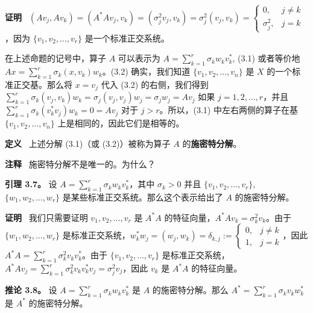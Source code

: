 \textbf{证明}~ $(Av_j, Av_k) = (A^*Av_j, v_k) = (\sigma_j^2 v_j, v_k) = \sigma_j^2 (v_j, v_k) = \begin{cases} 0, & j \neq k \\ \sigma_j^2, & j = k \end{cases}$，因为 $\{v_1, v_2, \dots, v_r\}$ 是一个标准正交系统。

在上述命题的记号中，算子 $A$ 可以表示为
$A = \sum_{k=1}^r \sigma_k w_k v_k^*$, (3.1)
或者等价地
$Ax = \sum_{k=1}^r \sigma_k (x, v_k) w_k$。(3.2)
确实，我们知道 $\{v_1, v_2, \dots, v_n\}$ 是 $X$ 的一个标准正交基。那么将 $x = v_j$ 代入 (3.2) 的右侧，我们得到 $\sum_{k=1}^r \sigma_k (v_j, v_k) w_k = \sigma_j (v_j, v_j) w_j = \sigma_j w_j = Av_j$ 如果 $j=1, 2, \dots, r$，并且 $\sum_{k=1}^r \sigma_k (v_k^* v_j) w_k = 0 = Av_j$ 对于 $j > r$。所以，(3.1) 中左右两侧的算子在基 $\{v_1, v_2, \dots, v_n\}$ 上是相同的，因此它们是相等的。

\textbf{定义}~ 上述分解 (3.1)（或 (3.2)）被称为算子 $A$ 的\textbf{施密特分解}。

\textbf{注释} ~施密特分解不是唯一的。为什么？



\textbf{引理 3.7。} 设 $A = \sum_{k=1}^r \sigma_k w_k v_k^*$，其中 $\sigma_k > 0$ 并且 $\{v_1, v_2, \dots, v_r\}$, $\{w_1, w_2, \dots, w_r\}$ 是某些标准正交系统。那么这个表示给出了 $A$ 的施密特分解。

\textbf{证明}~ 我们只需要证明 $v_1, v_2, \dots, v_r$ 是 $A^*A$ 的特征向量，$A^*Av_k = \sigma_k^2 v_k$。由于 $\{w_1, w_2, \dots, w_r\}$ 是标准正交系统，$w_k^* w_j = (w_j, w_k) = \delta_{k,j} := \begin{cases} 0, & j \neq k \\ 1, & j = k \end{cases}$，因此 $A^*A = \sum_{k=1}^r \sigma_k^2 v_k v_k^*$。由于 $\{v_1, v_2, \dots, v_r\}$ 是标准正交系统，$A^*Av_j = \sum_{k=1}^r \sigma_k^2 v_k v_k^* v_j = \sigma_j^2 v_j$，因此 $v_k$ 是 $A^*A$ 的特征向量。

\textbf{推论 3.8。} 设 $A = \sum_{k=1}^r \sigma_k w_k v_k^*$ 是 $A$ 的施密特分解。那么 $A^* = \sum_{k=1}^r \sigma_k v_k w_k^*$ 是 $A^*$ 的施密特分解。

